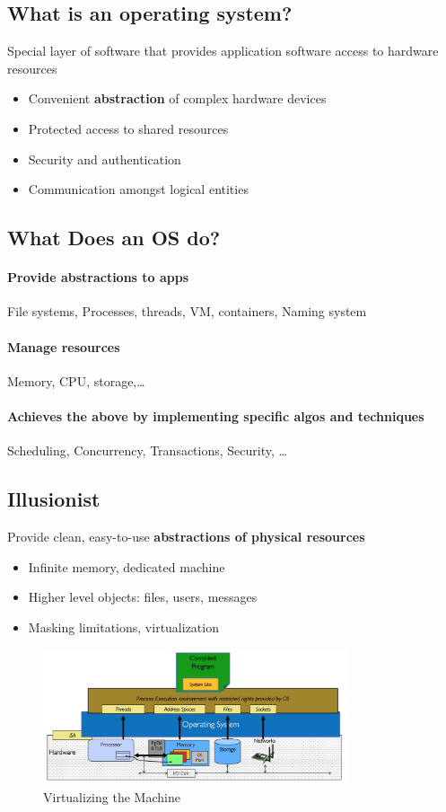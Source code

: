 \subsection{What is an operating system?}
Special layer of software that provides application software access to hardware resources
\begin{itemize}
    \item Convenient \textbf{abstraction} of complex hardware devices
    \item Protected access to shared resources
    \item Security and authentication
    \item Communication amongst logical entities
\end{itemize}
\subsection{What Does an OS do?}
\paragraph{Provide abstractions to apps}File systems, Processes, threads, VM, containers, Naming system

\paragraph{Manage resources} Memory, CPU, storage,\dots

\paragraph{Achieves the above by implementing specific algos and techniques}Scheduling, Concurrency, Transactions, Security, \dots

\subsection{Illusionist}
Provide clean, easy-to-use \textbf{abstractions of physical resources}
\begin{itemize}
    \item Infinite memory, dedicated machine
    \item Higher level objects: files, users, messages
    \item Masking limitations, virtualization
\end{itemize}
\begin{figure}[H]
    \centering
    \includegraphics[width = 0.8\textwidth ]{figures/Virtualizing the Machine.jpg}
    \caption{Virtualizing the Machine}
\end{figure}

